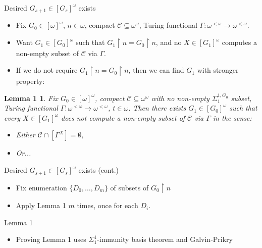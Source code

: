 \begin{frame}{Desired $G_{s+1}\in[G_s]^\omega$ exists}
  \begin{itemize}
    \item Fix $G_0\in[\omega]^\omega$, $n\in\omega$, compact
      $\mathcal{C}\subseteq\omega^\omega$, Turing functional
      $\Gamma:\omega^{<\omega} \rightarrow \omega^{<\omega}$.

    \item Want $G_1\in[G_0]^\omega$ such that $G_1\restriction
      n=G_0\restriction n$, and no $X\in[G_1]^\omega$ computes a non-empty
      subset of $\mathcal{C}$ via $\Gamma$.

    \item If we do not require $G_1\restriction n=G_0\restriction n$, then
      we can find $G_1$ with stronger property:
  \end{itemize}

  \newtheorem{L1}{Lemma 1}
  \begin{L1}
    Fix $G_0\in[\omega]^\omega$, compact
    $\mathcal{C}\subseteq\omega^\omega$ with no non-empty
    $\Sigma_1^{1,G_0}$ subset, Turing functional $\Gamma:\omega^{<\omega}
    \rightarrow \omega^{<\omega}$, $t\in\omega$. Then there exists
    $G_1\in[G_0]^\omega$ such that every $X\in[G_1]^\omega$ does not
    compute a non-empty subset of $\mathcal{C}$ via $\Gamma$ in the
    sense:

    \begin{itemize}
      \item Either $\mathcal{C}\cap[\Gamma^X]=\emptyset$,
      \item Or...
    \end{itemize}
  \end{L1}
\end{frame}

\begin{frame}{Desired $G_{s+1}\in[G_s]^\omega$ exists (cont.)}
  \begin{itemize}
      \item Fix enumeration $\{D_0,\ldots,D_m\}$ of subsets of
        $G_0\restriction n$

      \item Apply Lemma 1 $m$ times, once for each $D_i$.
  \end{itemize}
\end{frame}

\begin{frame}{Lemma 1}
  \begin{itemize}
    \item Proving Lemma 1 uses $\Sigma_1^1$-immunity basis theorem and
      Galvin-Prikry
  \end{itemize}
\end{frame}

